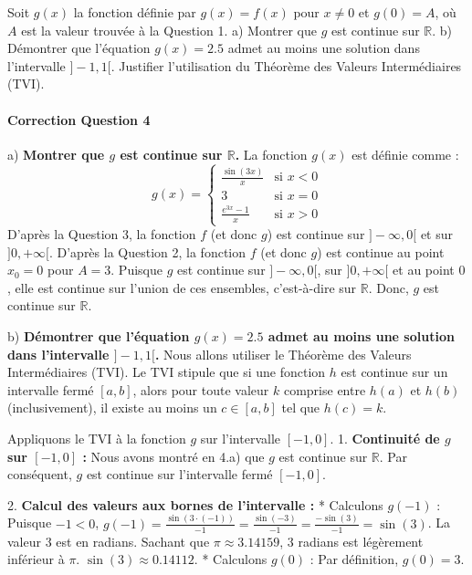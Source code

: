 \documentclass[12pt,a4paper]{report}
\begin{document}
Soit $g(x)$ la fonction définie par $g(x) = f(x)$ pour $x \neq 0$ et $g(0) = A$, où $A$ est la valeur trouvée à la Question 1.
a) Montrer que $g$ est continue sur $\mathbb{R}$.
b) Démontrer que l'équation $g(x) = 2.5$ admet au moins une solution dans l'intervalle $]-1, 1[$. Justifier l'utilisation du Théorème des Valeurs Intermédiaires (TVI).

\paragraph{Correction Question 4}

a) \textbf{Montrer que $g$ est continue sur $\mathbb{R}$.}
La fonction $g(x)$ est définie comme :
$$ g(x) = \begin{cases} \frac{\sin(3x)}{x} & \text{si } x < 0 \\ 3 & \text{si } x = 0 \\ \frac{e^{3x} - 1}{x} & \text{si } x > 0 \end{cases} $$
D'après la Question 3, la fonction $f$ (et donc $g$) est continue sur $]-\infty, 0[$ et sur $]0, +\infty[$.
D'après la Question 2, la fonction $f$ (et donc $g$) est continue au point $x_0 = 0$ pour $A=3$.
Puisque $g$ est continue sur $]-\infty, 0[$, sur $]0, +\infty[$ et au point $0$, elle est continue sur l'union de ces ensembles, c'est-à-dire sur $\mathbb{R}$.
Donc, $g$ est continue sur $\mathbb{R}$.

b) \textbf{Démontrer que l'équation $g(x) = 2.5$ admet au moins une solution dans l'intervalle $]-1, 1[$.}
Nous allons utiliser le Théorème des Valeurs Intermédiaires (TVI).
Le TVI stipule que si une fonction $h$ est continue sur un intervalle fermé $[a, b]$, alors pour toute valeur $k$ comprise entre $h(a)$ et $h(b)$ (inclusivement), il existe au moins un $c \in [a, b]$ tel que $h(c) = k$.

Appliquons le TVI à la fonction $g$ sur l'intervalle $[-1, 0]$.
1.  \textbf{Continuité de $g$ sur $[-1, 0]$ :}
    Nous avons montré en 4.a) que $g$ est continue sur $\mathbb{R}$. Par conséquent, $g$ est continue sur l'intervalle fermé $[-1, 0]$.

2.  \textbf{Calcul des valeurs aux bornes de l'intervalle :}
    *   Calculons $g(-1)$ :
        Puisque $-1 < 0$, $g(-1) = \frac{\sin(3 \cdot (-1))}{-1} = \frac{\sin(-3)}{-1} = \frac{-\sin(3)}{-1} = \sin(3)$.
        La valeur $3$ est en radians. Sachant que $\pi \approx 3.14159$, $3$ radians est légèrement inférieur à $\pi$.
        $\sin(3) \approx 0.14112$.
    *   Calculons $g(0)$ :
        Par définition, $g(0) = 3$.
\end{document}

